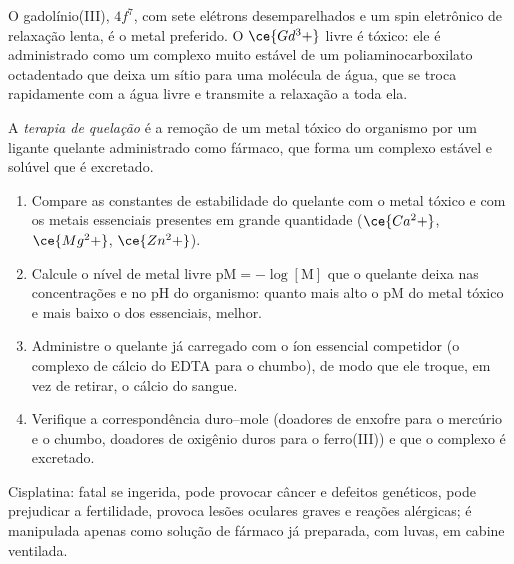 O gadolínio(III), $4f^7$, com sete elétrons desemparelhados e um spin eletrônico de relaxação
lenta, é o metal preferido. O $\ce{Gd^3+}$ livre é tóxico: ele é administrado como um
complexo muito estável de um poliaminocarboxilato octadentado que deixa um
sítio para uma molécula de água, que se troca rapidamente com a água livre e transmite a
relaxação a toda ela.

\begin{definition}\label{def:b3:bioinorganic:chelation-therapy}
A \emph{terapia de quelação} é a remoção de um metal
tóxico do organismo por um ligante quelante administrado como fármaco, que forma um complexo
estável e solúvel que é excretado.
\end{definition}

\begin{method}\label{met:b3:bioinorganic:choose-chelator}
\begin{enumerate}
  \item Compare as constantes de estabilidade do quelante com o metal tóxico
        e com os metais essenciais presentes em grande quantidade ($\ce{Ca^2+}$, $\ce{Mg^2+}$,
        $\ce{Zn^2+}$).
  \item Calcule o nível de metal livre $\mathrm{pM} = -\log[\mathrm M]$ que o quelante deixa nas
        concentrações e no pH do organismo: quanto mais alto o pM do metal tóxico e mais
        baixo o dos essenciais, melhor.
  \item Administre o quelante já carregado com o íon essencial competidor (o
        complexo de cálcio do EDTA para o chumbo), de modo que ele troque, em vez de
        retirar, o cálcio do sangue.
  \item Verifique a correspondência duro--mole (doadores de enxofre para o mercúrio e o chumbo, doadores
        de oxigênio duros para o ferro(III)) e que o complexo é excretado.
\end{enumerate}
\end{method}

\begin{safety}{}
Cisplatina: fatal se ingerida, pode provocar câncer e defeitos genéticos, pode prejudicar
a fertilidade, provoca lesões oculares graves e reações alérgicas; é manipulada
apenas como solução de fármaco já preparada, com luvas, em cabine ventilada.
\end{safety}

